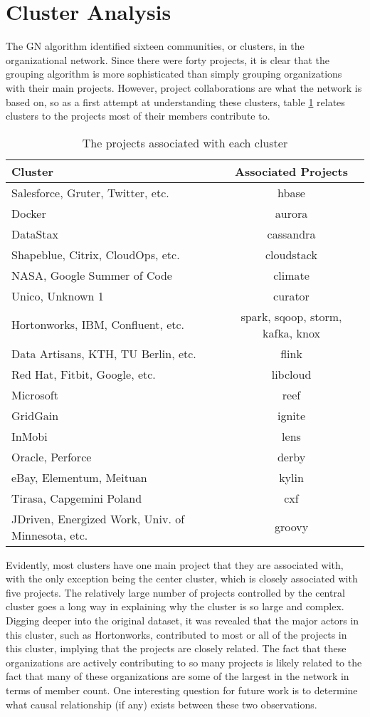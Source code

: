 \section{Cluster Analysis}\label{clustersection}
The GN algorithm identified sixteen communities, or clusters, in the organizational network. Since there were forty projects, it is clear that the grouping algorithm is more sophisticated than simply grouping organizations with their main projects. However, project collaborations are what the network is based on, so as a first attempt at understanding these clusters, table \ref{tab:clusterprojects} relates clusters to the projects most of their members contribute to.
\begin{table}
	\begin{tabular}{l|c}
		\bfseries Cluster & \bfseries Associated Projects \\
		\hline
		Salesforce, Gruter, Twitter, etc. & hbase \\
		Docker & aurora \\
		DataStax & cassandra \\
		Shapeblue, Citrix, CloudOps, etc. & cloudstack \\
		NASA, Google Summer of Code & climate \\
		Unico, Unknown 1 & curator \\
		Hortonworks, IBM, Confluent, etc. & spark, sqoop, storm, kafka, knox \\
		Data Artisans, KTH, TU Berlin, etc. & flink \\
		Red Hat, Fitbit, Google, etc. & libcloud \\
		Microsoft & reef \\
		GridGain & ignite \\
		InMobi & lens \\
		Oracle, Perforce & derby \\
		eBay, Elementum, Meituan & kylin \\
		Tirasa, Capgemini Poland & cxf \\
		JDriven, Energized Work, Univ. of Minnesota, etc. & groovy
	\end{tabular}
	\caption{The projects associated with each cluster}\label{tab:clusterprojects}
\end{table}

Evidently, most clusters have one main project that they are associated with, with the only exception being the center cluster, which is closely associated with five projects. The relatively large number of projects controlled by the central cluster goes a long way in explaining why the cluster is so large and complex. Digging deeper into the original dataset, it was revealed that the major actors in this cluster, such as Hortonworks, contributed to most or all of the projects in this cluster, implying that the projects are closely related. The fact that these organizations are actively contributing to so many projects is likely related to the fact that many of these organizations are some of the largest in the network in terms of member count. One interesting question for future work is to determine what causal relationship (if any) exists between these two observations.